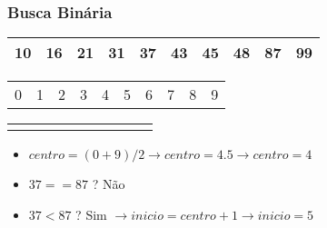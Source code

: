\documentclass{beamer}
\begin{document}
\begin{frame}
    \frametitle{Busca Binária}
    \begin{center}
        \begin{table}
            \begin{tabular}{| p{0.25cm} | p{0.25cm} | p{0.25cm} | p{0.25cm} | p{0.25cm} | p{0.25cm} | p{0.25cm} | p{0.25cm} | p{0.25cm} | p{0.25cm} |}
                \hline
                10 & 16 & 21 & 31 & 37 & 43 & 45 & 48 & 87 & 99 \\ \hline
            \end{tabular}
            \begin{tabular}{p{0.25cm} p{0.25cm} p{0.25cm} p{0.25cm} p{0.25cm} p{0.25cm} p{0.25cm} p{0.25cm} p{0.25cm} p{0.25cm}}
                0 & 1 & 2 & 3 & 4 & 5 & 6 & 7 & 8 & 9
            \end{tabular}
            \begin{tabular}{p{0.25cm} p{0.25cm} p{0.25cm} p{0.25cm} p{0.25cm} p{0.25cm} p{0.25cm} p{0.25cm} p{0.25cm} p{0.25cm}}
                & & & & \color{red}{$\uparrow$} & & & & &
            \end{tabular}
        \end{table}
	\end{center}
    \begin{itemize}[<+->]
        \item $centro = (0 + 9) / 2 \rightarrow centro = 4.5 \rightarrow centro = 4$
        \item $37 == 87$ ? Não
        \item $37 < 87$ ? Sim $\rightarrow inicio = centro + 1 \rightarrow inicio = 5$
    \end{itemize}
\end{frame}
\end{document}
